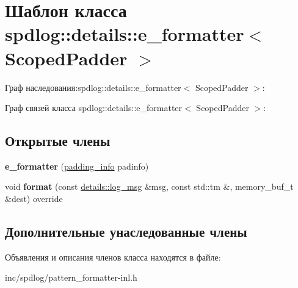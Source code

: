 \hypertarget{classspdlog_1_1details_1_1e__formatter}{}\section{Шаблон класса spdlog\+:\+:details\+:\+:e\+\_\+formatter$<$ Scoped\+Padder $>$}
\label{classspdlog_1_1details_1_1e__formatter}


Граф наследования\+:spdlog\+:\+:details\+:\+:e\+\_\+formatter$<$ Scoped\+Padder $>$\+:


Граф связей класса spdlog\+:\+:details\+:\+:e\+\_\+formatter$<$ Scoped\+Padder $>$\+:
\subsection*{Открытые члены}
\begin{DoxyCompactItemize}
\item 
\mbox{\label{classspdlog_1_1details_1_1e__formatter_a12f3c8c85670f3f57164ff564a16874f}} 
{\bfseries e\+\_\+formatter} (\hyperlink{structspdlog_1_1details_1_1padding__info}{padding\+\_\+info} padinfo)
\item 
\mbox{\label{classspdlog_1_1details_1_1e__formatter_aeae8b76aa3290f593c971b90fc8c20f6}} 
void {\bfseries format} (const \hyperlink{structspdlog_1_1details_1_1log__msg}{details\+::log\+\_\+msg} \&msg, const std\+::tm \&, memory\+\_\+buf\+\_\+t \&dest) override
\end{DoxyCompactItemize}
\subsection*{Дополнительные унаследованные члены}


Объявления и описания членов класса находятся в файле\+:\begin{DoxyCompactItemize}
\item 
inc/spdlog/pattern\+\_\+formatter-\/inl.\+h\end{DoxyCompactItemize}
